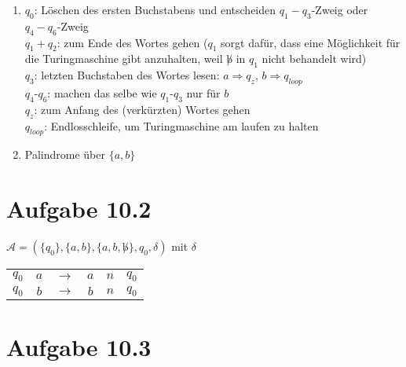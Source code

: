 \documentclass{article}
\begin{document}
\begin{enumerate}[label=(\alph*)]
\begin{center}
		\end{center}
		\item $q_0$: Löschen des ersten Buchstabens und entscheiden $q_1-q_3$-Zweig oder $q_4-q_6$-Zweig \\
		$q_1+q_2$: zum Ende des Wortes gehen ($q_1$ sorgt dafür, dass eine Möglichkeit für die Turingmaschine gibt anzuhalten, weil $\not b$ in $q_1$ nicht behandelt wird) \\
		$q_3$: letzten Buchstaben des Wortes lesen: $a\Rightarrow q_z$, $b\Rightarrow q_{loop}$ \\
		$q_4$-$q_6$: machen das selbe wie $q_1$-$q_3$ nur für $b$ \\
		$q_z$: zum Anfang des (verkürzten) Wortes gehen \\
		$q_{loop}$: Endlosschleife, um Turingmaschine am laufen zu halten
		\item Palindrome über $\{a,b\}$
	\end{enumerate}
	
	\section*{Aufgabe 10.2}

	$\mathcal{A}=(\{q_0\},\{a,b\},\{a,b,\not b\},q_0,\delta)$ mit $\delta$
	\begin{center}
		\begin{tabular}{cccccc}
			$q_0$ & $a$ & $\to$ & $a$ & $n$ & $q_0$ \\
			$q_0$ & $b$ & $\to$ & $b$ & $n$ & $q_0$
		\end{tabular}
	\end{center}

	\section*{Aufgabe 10.3}
	
\end{document}
